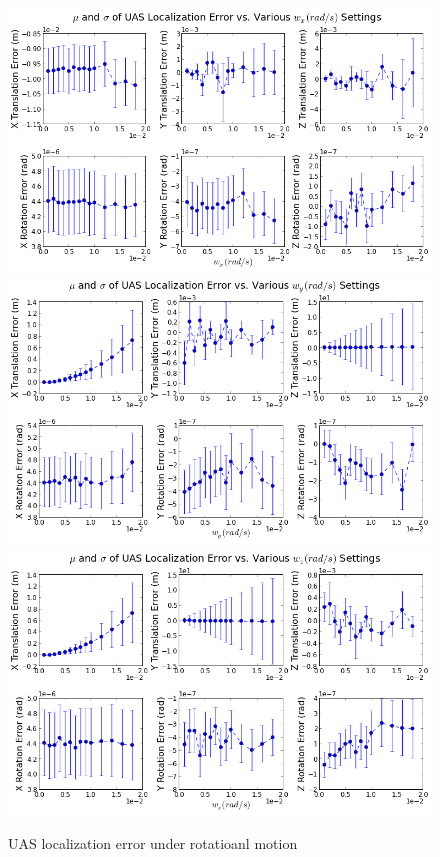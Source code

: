 \begin{figure}[h]
  \centering
  \includegraphics[scale=0.25]{./Figures/SimulationFigures/Figure11.png}
  \includegraphics[scale=0.25]{./Figures/SimulationFigures/Figure12.png}
  \includegraphics[scale=0.25]{./Figures/SimulationFigures/Figure13.png}
  \caption{UAS localization error under rotatioanl motion}
  \label{fig:simfig11-13}
\end{figure}

